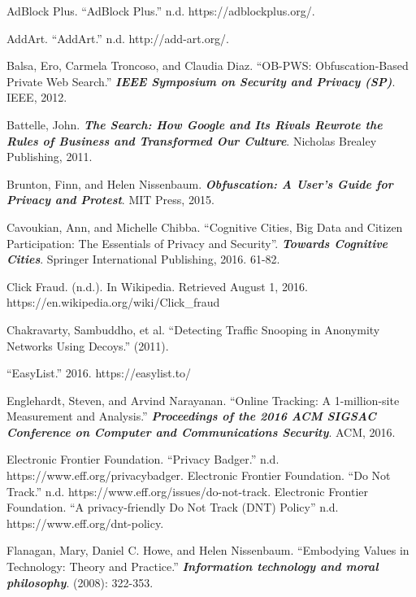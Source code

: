 \documentclass[conference]{IEEEtran}
\begin{document}
\begin{thebibliography}{99}

 AdBlock Plus. “AdBlock Plus.” n.d. https://adblockplus.org/.

 AddArt. “AddArt.” n.d. http://add-art.org/.

 Balsa, Ero, Carmela Troncoso, and Claudia Diaz. ``OB-PWS: Obfuscation-Based Private Web Search.'' \textbf{\textit{IEEE Symposium on Security and Privacy (SP)}}. IEEE, 2012.

 Battelle, John. \textbf{\textit{ The Search: How Google and Its Rivals Rewrote the Rules of Business and Transformed Our Culture}}. Nicholas Brealey Publishing, 2011.

 Brunton, Finn, and Helen Nissenbaum. \textbf{\textit{Obfuscation: A User's Guide for Privacy and Protest}}. MIT Press, 2015.

 Cavoukian, Ann, and Michelle Chibba. “Cognitive Cities, Big Data and Citizen Participation: The Essentials of Privacy and Security”. \textbf{\textit{Towards Cognitive Cities}}. Springer International Publishing, 2016. 61-82.

 Click Fraud. (n.d.). In Wikipedia. Retrieved August 1, 2016. https://en.wikipedia.org/wiki/Click\_fraud

 Chakravarty, Sambuddho, et al. “Detecting Traffic Snooping in Anonymity Networks Using Decoys.” (2011).

 “EasyList.” 2016. https://easylist.to/

 Englehardt, Steven, and Arvind Narayanan. “Online Tracking: A 1-million-site Measurement and Analysis.” \textbf{\textit{Proceedings of the 2016 ACM SIGSAC Conference on Computer and Communications Security}}. ACM, 2016.

 Electronic Frontier Foundation. “Privacy Badger.” n.d. https://www.eff.org/privacybadger.
 Electronic Frontier Foundation. “Do Not Track.” n.d. https://www.eff.org/issues/do-not-track.
 Electronic Frontier Foundation. “A privacy-friendly Do Not Track (DNT) Policy” n.d. https://www.eff.org/dnt-policy.

 Flanagan, Mary, Daniel C. Howe, and Helen Nissenbaum. “Embodying Values in Technology: Theory and Practice.” \textbf{\textit{Information technology and moral philosophy}}. (2008): 322-353.


\end{thebibliography}
\end{document}
